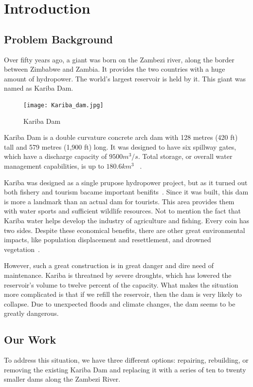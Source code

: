 \documentclass{mcmthesis}
\begin{document}
\iffalse
\newpage
\section{Introduction}	
\subsection{Problem Background}
	Over fifty years ago, a giant was born on the Zambezi river, along the border between Zimbabwe and Zambia. It provides the two countries with a huge amount of hydropower. The world's largest reservoir is held by it. This giant was named as Kariba Dam.
\begin{figure}[h]
    \centering
    \texttt{[image: Kariba\_dam.jpg]}
    \caption{Kariba Dam~\cite{Wiki_Kariba}}
    \label{fig:dam}
\end{figure}

Kariba Dam is a double curvature concrete arch dam with 128 metres (420 ft) tall and 579 metres (1,900 ft) long. It was designed to have six spillway gates, which have a discharge capacity of $9500m^3/s$. Total storage, or overall water management capabilities, is up to $180.6km^3$ ~\cite{WCD_Dam}.

Kariba was designed as a single prupose hydropower project, but as it turned out both fishery and tourism bacame important benifits~\cite{WCD_Dam}. Since it was built, this dam is more a landmark than an actual dam for tourists. This area provides them with water sports and sufficient wildlife resources. Not to mention the fact that Kariba water helps develop the industry of agriculture and fishing. Every coin has two sides. Despite these economical benefits, there are other great environmental impacts, like population displacement and resettlement, and drowned vegetation~\cite{Wiki_Kariba}.

However, such a great construction is in great danger and dire need of maintenance. Kariba is threatned by severe droughts, which has lowered the reservoir's volume to twelve percent of the capacity. What makes the situation more complicated is that if we refill the reservoir, then the dam is very likely to collapse. Due to unexpected floods and climate changes, the dam seems to be greatly dangerous.
\subsection{Our Work}
To address this situation, we have three different options: repairing, rebuilding, or removing the existing Kariba Dam and replacing it with a series of ten to twenty smaller dams along the Zambezi River.
\end{document}
